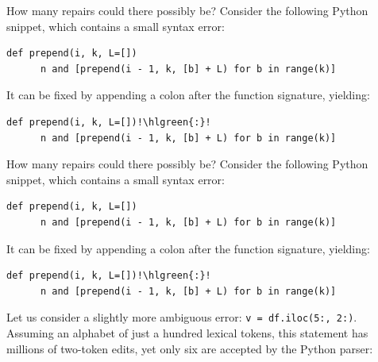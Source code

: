 \documentclass{beamer}
\begin{document}
\begin{frame}[t,fragile]{How many repairs could there possibly be?}
  Consider the following Python snippet, which contains a small syntax error:\\

  \begin{lstlisting}[escapechar=!, basicstyle=\linespread{1.3}\ttfamily\footnotesize]
    def prepend(i, k, L=[])
      n and [prepend(i - 1, k, [b] + L) for b in range(k)]
  \end{lstlisting}

  It can be fixed by appending a colon after the function signature, yielding:\\

    \begin{lstlisting}[escapechar=!, basicstyle=\linespread{1.3}\ttfamily\footnotesize]
    def prepend(i, k, L=[])!\hlgreen{:}!
      n and [prepend(i - 1, k, [b] + L) for b in range(k)]
    \end{lstlisting}
\end{frame}

\begin{frame}[t,fragile]{How many repairs could there possibly be?}
  Consider the following Python snippet, which contains a small syntax error:\\

  \begin{lstlisting}[escapechar=!, basicstyle=\linespread{1.3}\ttfamily\footnotesize]
    def prepend(i, k, L=[])
      n and [prepend(i - 1, k, [b] + L) for b in range(k)]
  \end{lstlisting}

  It can be fixed by appending a colon after the function signature, yielding:\\

  \begin{lstlisting}[escapechar=!, basicstyle=\linespread{1.3}\ttfamily\footnotesize]
    def prepend(i, k, L=[])!\hlgreen{:}!
      n and [prepend(i - 1, k, [b] + L) for b in range(k)]
  \end{lstlisting}

  \vspace{0.5cm}

  \normalsize Let us consider a slightly more ambiguous error: \footnotesize{\texttt{v = df.iloc(5:, 2:)}}. \normalsize Assuming an alphabet of just a hundred lexical tokens, this statement has millions of two-token edits, yet only six are accepted by the Python parser:
\end{frame}
\end{document}
